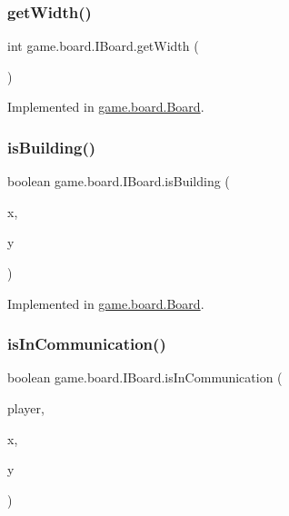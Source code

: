 \mbox{\label{interfacegame_1_1board_1_1_i_board_a86c145dd3518d14b37f6b50ee67bc629}} 
\subsubsection{\texorpdfstring{get\+Width()}{getWidth()}}
{\footnotesize\ttfamily int game.\+board.\+I\+Board.\+get\+Width (\begin{DoxyParamCaption}{ }\end{DoxyParamCaption})}



Implemented in \mbox{\hyperlink{classgame_1_1board_1_1_board_a831e13d9108a75d6efc5a92994ea1316}{game.\+board.\+Board}}.

\mbox{\label{interfacegame_1_1board_1_1_i_board_aa493421a953d10fc9eaf45fa74f0a64d}} 
\subsubsection{\texorpdfstring{is\+Building()}{isBuilding()}}
{\footnotesize\ttfamily boolean game.\+board.\+I\+Board.\+is\+Building (\begin{DoxyParamCaption}\item[{int}]{x,  }\item[{int}]{y }\end{DoxyParamCaption})}



Implemented in \mbox{\hyperlink{classgame_1_1board_1_1_board_a6b6e3fb41b451a50ef9d5135067c2582}{game.\+board.\+Board}}.

\mbox{\label{interfacegame_1_1board_1_1_i_board_a56c04deed490c7894f738f6d76f62f07}} 
\subsubsection{\texorpdfstring{is\+In\+Communication()}{isInCommunication()}}
{\footnotesize\ttfamily boolean game.\+board.\+I\+Board.\+is\+In\+Communication (\begin{DoxyParamCaption}\item[{\mbox{\hyperlink{enumgame_1_1_e_player}{E\+Player}}}]{player,  }\item[{int}]{x,  }\item[{int}]{y }\end{DoxyParamCaption})}



